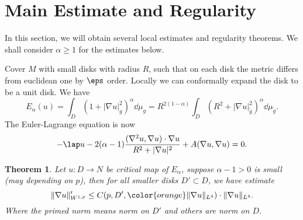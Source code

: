 \documentclass[UTF8,12pt]{article}
\theoremstyle{plain}\newtheorem{theorem}{Theorem}
\theoremstyle{definition}\newtheorem{definition}[theorem]{Definition}
\theoremstyle{definition}\newtheorem{example}[theorem]{Example}
\theoremstyle{plain}\newtheorem{axiom}[theorem]{Axiom}
\theoremstyle{plain}\newtheorem{assertion}[theorem]{Assertion}
\theoremstyle{plain}\newtheorem{corollary}[theorem]{Corollary}
\theoremstyle{plain}\newtheorem{lemma}[theorem]{Lemma}
\theoremstyle{plain}\newtheorem{proposition}[theorem]{Proposition}
\theoremstyle{plain}\newtheorem{prop}[theorem]{Proposition}
\theoremstyle{plain}\newtheorem{conjecture}[theorem]{Conjecture}
\theoremstyle{plain}\newtheorem{conj}[theorem]{Conjecture}
\theoremstyle{plain}\newtheorem{problem}[theorem]{Problem}
\theoremstyle{remark}\newtheorem{notation}[theorem]{Notation}
\theoremstyle{definition}\newtheorem*{question}{Question}
\theoremstyle{definition}\newtheorem*{answer}{Answer}
\theoremstyle{definition}\newtheorem*{goal}{Goal}
\theoremstyle{plain}\newtheorem*{application}{Application}
\theoremstyle{plain}\newtheorem*{exercise}{Exercise}
\theoremstyle{remark}\newtheorem*{remark}{Remark}
\theoremstyle{remark}\newtheorem*{note}{\small{Note}}
\numberwithin{equation}{section}
\numberwithin{theorem}{section}
\numberwithin{figure}{section}
\begin{document}
\section{Main Estimate and Regularity}
In this section, we will obtain several local estimates and regularity theorems.
We shall consider \(\alpha\ge 1\) for the estimates below.

Cover \(M\) with small disks with radius \(R\), such that on each disk the metric
differs from euclidean one by \(\eps\) order. Locally we can conformally expand
the disk to be a unit disk. We have \[
    E_\alpha(u)=\int_D(1+|\nabla u|_{g}^2)^{\alpha}\dd{\mu_g}
    =R^{2(1-\alpha)}\int_D(R^2+|\nabla u|_{\tilde{g}}^2)^{\alpha}\dd{\mu_{\tilde{g}}}
.\] The Euler-Lagrange equation is now
\begin{equation}\label{eq:e-l-disk}
    -\lap u-2(\alpha-1)\frac{(\nabla^2 u,\nabla u)\cdot\nabla u}{R^2+|\nabla u|^2}
    +A(\nabla u,\nabla u)=0
.\end{equation}
\begin{theorem}
    Let \(u\colon D\to N\) be critical map of \(E_\alpha\), suppose \(\alpha-1>0\) is
    small (may depending on \(p\)), then for all smaller disks \(D'\subset D\),
    we have estimate \[
        \|\nabla u\|_{W^{1,p}}'\le C(p,D',{\color{orange}\|\nabla u\|_{L^4}})
        \cdot \|\nabla u\|_{L^4}
    .\] Where the primed norm means norm on \(D'\) and others are norm on \(D\).
\end{theorem}
\end{document}
